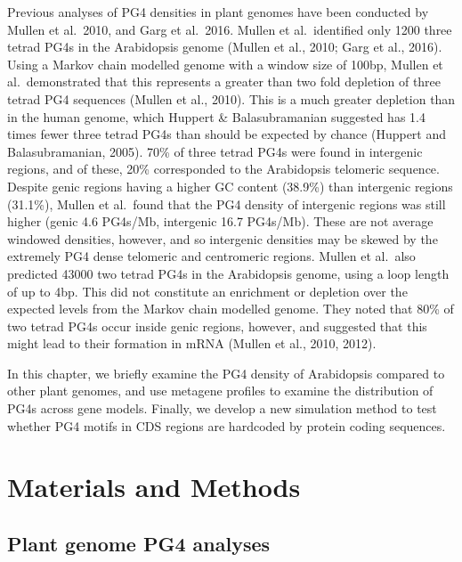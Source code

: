 \documentclass[12pt,a4paper,]{report}
\begin{document}
Previous analyses of PG4 densities in plant genomes have been conducted
by Mullen et al.~2010, and Garg et al.~2016. Mullen et al.~identified
only 1200 three tetrad PG4s in the Arabidopsis genome (Mullen et al.,
2010; Garg et al., 2016). Using a Markov chain modelled genome with a
window size of 100bp, Mullen et al.~demonstrated that this represents a
greater than two fold depletion of three tetrad PG4 sequences (Mullen et
al., 2010). This is a much greater depletion than in the human genome,
which Huppert \& Balasubramanian suggested has 1.4 times fewer three
tetrad PG4s than should be expected by chance (Huppert and
Balasubramanian, 2005). 70\% of three tetrad PG4s were found in
intergenic regions, and of these, 20\% corresponded to the Arabidopsis
telomeric sequence. Despite genic regions having a higher GC content
(38.9\%) than intergenic regions (31.1\%), Mullen et al.~found that the
PG4 density of intergenic regions was still higher (genic 4.6 PG4s/Mb,
intergenic 16.7 PG4s/Mb). These are not average windowed densities,
however, and so intergenic densities may be skewed by the extremely PG4
dense telomeric and centromeric regions. Mullen et al.~also predicted
43000 two tetrad PG4s in the Arabidopsis genome, using a loop length of
up to 4bp. This did not constitute an enrichment or depletion over the
expected levels from the Markov chain modelled genome. They noted that
80\% of two tetrad PG4s occur inside genic regions, however, and
suggested that this might lead to their formation in mRNA (Mullen et
al., 2010, 2012).

In this chapter, we briefly examine the PG4 density of Arabidopsis
compared to other plant genomes, and use metagene profiles to examine
the distribution of PG4s across gene models. Finally, we develop a new
simulation method to test whether PG4 motifs in CDS regions are
hardcoded by protein coding sequences.

\newpage

\hypertarget{materials-and-methods-1}{%
\section{Materials and Methods}\label{materials-and-methods-1}}

\hypertarget{plant-genome-pg4-analyses}{%
\subsection{Plant genome PG4 analyses}\label{plant-genome-pg4-analyses}}
\end{document}

